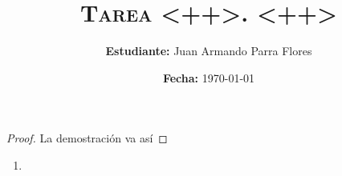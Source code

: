 \documentclass[11pt]{article}
\title{
    \textsc{
        \textbf{Tarea <++>.} <++>
    }
}
\author{
    \textbf{Estudiante:} Juan Armando Parra Flores
}
\date{
    \textbf{Fecha:} \today
}
\begin{document}
    \maketitle

    \begin{proof}
        La demostración va así
    \end{proof}

    \begin{enumerate}
        \item
            
            
    \end{enumerate}

\end{document}
